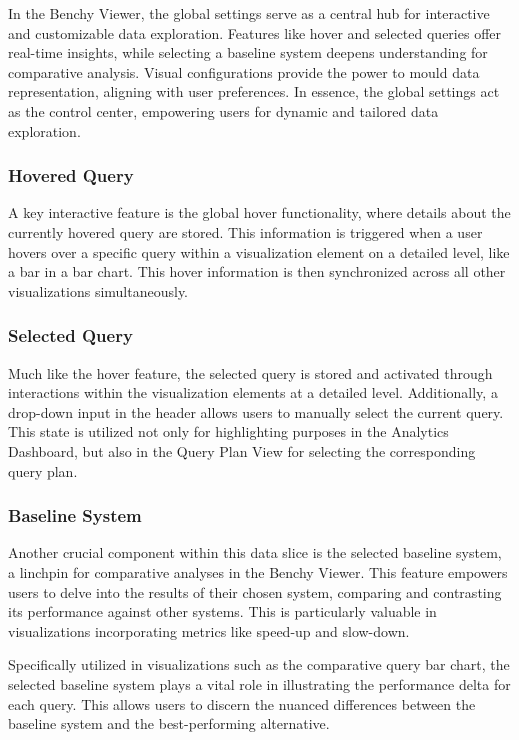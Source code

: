 In the Benchy Viewer, the global settings serve as a central hub for interactive and customizable data exploration. Features like hover and selected queries offer real-time insights, while selecting a baseline system deepens understanding for comparative analysis. Visual configurations provide the power to mould data representation, aligning with user preferences. In essence, the global settings act as the control center, empowering users for dynamic and tailored data exploration.

\subsubsection{Hovered Query}

A key interactive feature is the global hover functionality, where details about the currently hovered query are stored. This information is triggered when a user hovers over a specific query within a visualization element on a detailed level, like a bar in a bar chart. This hover information is then synchronized across all other visualizations simultaneously.

\subsubsection{Selected Query}

Much like the hover feature, the selected query is stored and activated through interactions within the visualization elements at a detailed level. Additionally, a drop-down input in the header allows users to manually select the current query. This state is utilized not only for highlighting purposes in the Analytics Dashboard, but also in the Query Plan View for selecting the corresponding query plan.

\subsubsection{Baseline System}

Another crucial component within this data slice is the selected baseline system, a linchpin for comparative analyses in the Benchy Viewer. This feature empowers users to delve into the results of their chosen system, comparing and contrasting its performance against other systems. This is particularly valuable in visualizations incorporating metrics like speed-up and slow-down.

Specifically utilized in visualizations such as the comparative query bar chart, the selected baseline system plays a vital role in illustrating the performance delta for each query. This allows users to discern the nuanced differences between the baseline system and the best-performing alternative. 

